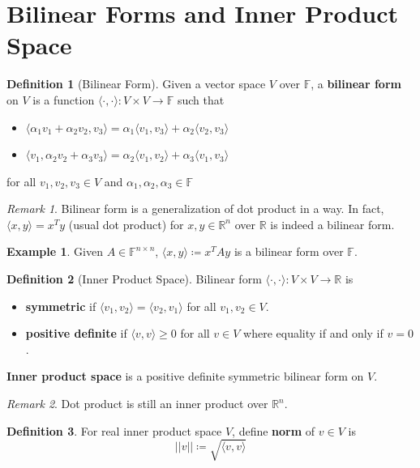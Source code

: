 \documentclass[12pt, a4paper]{article}
\newcommand{\R}{\mathbb{R}}
\newcommand{\inner}[1]{\langle #1 \rangle}
\newcommand{\norm}[1]{\lvert \lvert #1 \rvert \rvert}
\theoremstyle{remark}
\newtheorem{remark}{Remark}
\theoremstyle{definition}
\newtheorem{definition}{Definition}
\newtheorem{example}{Example}
\numberwithin{equation}{section}
\numberwithin{definition}{section}
\numberwithin{example}{section}
\numberwithin{exercise}{section}
\numberwithin{remark}{section}
\numberwithin{figure}{section}
\begin{document}
\section{Bilinear Forms and Inner Product Space}
\begin{definition}[Bilinear Form]
    Given a vector space $V$ over $\mathbb{F}$,
    a \textbf{bilinear form} on $V$ is a function $\inner{\cdot, \cdot} : V \times V \rightarrow \mathbb{F}$
    such that
    \begin{itemize}
        \item $\inner{\alpha_1 v_1 + \alpha_2 v_2, v_3} = \alpha_1 \inner{v_1, v_3} + \alpha_2 \inner{v_2, v_3}$
        \item $\inner{v_1, \alpha_2 v_2 + \alpha_3 v_3} = \alpha_2 \inner{v_1, v_2} + \alpha_3 \inner{v_1, v_3}$
    \end{itemize}
    for all $v_1, v_2, v_3 \in V$ and $\alpha_1, \alpha_2, \alpha_3 \in \mathbb{F}$
\end{definition}
\begin{remark}
    Bilinear form is a generalization of dot product in a way.
    In fact, $\inner{x, y} = x^T y$ (usual dot product) for $x, y \in \R^n$ over $\R$ is indeed a bilinear form.
\end{remark}
\begin{example}
    Given $A \in \mathbb{F}^{n \times n}$, $\inner{x, y} \coloneqq x^T A y$ is a bilinear form over $\mathbb{F}$.
\end{example}
\begin{definition}[Inner Product Space]
    Bilinear form $\inner{\cdot, \cdot} : V \times V \rightarrow \mathbb{R}$ is
    \begin{itemize}
        \item \textbf{symmetric} if
            $\inner{v_1, v_2} = \inner{v_2, v_1}$ for all $v_1, v_2 \in V$.
        \item 
            \textbf{positive definite} if
            $\inner{v, v} \geq 0$ for all $v \in V$ where equality if and only if $v = 0$.
    \end{itemize}
    \textbf{Inner product space} is a positive definite symmetric bilinear form on $V$.
\end{definition}
\begin{remark}
    Dot product is still an inner product over $\mathbb{R}^n$.
\end{remark}
\begin{definition}
    For real inner product space $V$, define \textbf{norm} of $v \in V$ is
    \begin{equation*}
        \norm{v} \coloneqq \sqrt{\inner{v,v}}
    \end{equation*}
\end{definition}
\end{document}
